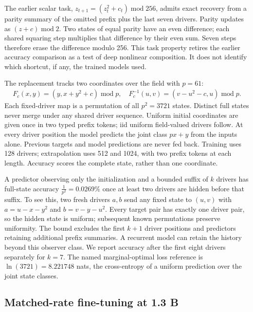 \documentclass[10pt]{article}
\theoremstyle{canonical}
\theoremstyle{canonicalbullet}
\begin{document}
The earlier scalar task, ${z }_{t + 1} =  ( {z }_{t }^{2} +  {c }_{t })  \operatorname{mod} 256$, admits exact recovery from a parity summary of the omitted prefix plus the last seven drivers. Parity updates as $( z  +  c )  \operatorname{mod} 2$. Two states of equal parity have an even difference; each shared squaring step multiplies that difference by their even sum. Seven steps therefore erase the difference modulo 256. This task property retires the earlier accuracy comparison as a test of deep nonlinear composition. It does not identify which shortcut, if any, the trained models used.

The replacement tracks two coordinates over the field with $p  =  61$:
\[\begin{aligned}{F }_{c }( x , y )  =  ( y ,  x  +  {y }^{2} +  c )  \operatorname{mod} p ,  \quad  {F }_{c }^{- 1}( u , v )  =  ( v  -  {u }^{2} -  c ,  u )  \operatorname{mod} p . \end{aligned}\]
 Each fixed-driver map is a permutation of all ${p }^{2} =  3721$ states. Distinct full states never merge under any shared driver sequence. Uniform initial coordinates are given once in two typed prefix tokens; iid uniform field-valued drivers follow. At every driver position the model predicts the joint class $p  x  +  y $ from the inputs alone. Previous targets and model predictions are never fed back. Training uses 128 drivers; extrapolation uses 512 and 1024, with two prefix tokens at each length. Accuracy scores the complete state, rather than one coordinate.

A predictor observing only the initialization and a bounded suffix of $k $ drivers has full-state accuracy $\frac{1}{{p }^{2}} =  0.0269\% $ once at least two drivers are hidden before that suffix. To see this, two fresh drivers $a , b $ send any fixed state to $( u , v ) $ with $a  =  u  -  x  -  {y }^{2}$ and $b  =  v  -  y  -  {u }^{2}$. Every target pair has exactly one driver pair, so the hidden state is uniform; subsequent known permutations preserve uniformity. The bound excludes the first $k + 1$ driver positions and predictors retaining additional prefix summaries. A recurrent model can retain the history beyond this observer class. We report accuracy after the first eight drivers separately for $k = 7$. The named marginal-optimal loss reference is $\operatorname{ln}( 3721)  =  8.221748$ nats, the cross-entropy of a uniform prediction over the joint state classes.


\subsection*{Matched-rate fine-tuning at 1.3 B}
\end{document}
